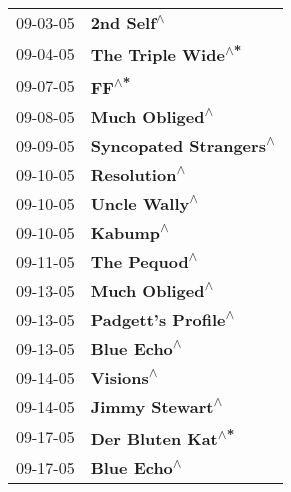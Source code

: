 \begin{supertabular}{p{0.25\columnwidth}p{0.75\columnwidth}}
 09-03-05 &                                                                 \textbf{2nd Self\textsuperscript{$\wedge$}} \\
 09-04-05 &                                                         \textbf{The Triple Wide\textsuperscript{$\wedge$*}} \\
 09-07-05 &                                                                      \textbf{FF\textsuperscript{$\wedge$*}} \\
 09-08-05 &                                                             \textbf{Much Obliged\textsuperscript{$\wedge$}} \\
 09-09-05 &                                                     \textbf{Syncopated Strangers\textsuperscript{$\wedge$}} \\
 09-10-05 &                                                               \textbf{Resolution\textsuperscript{$\wedge$}} \\
 09-10-05 &                                                              \textbf{Uncle Wally\textsuperscript{$\wedge$}} \\
 09-10-05 &                                                                   \textbf{Kabump\textsuperscript{$\wedge$}} \\
 09-11-05 &                                                               \textbf{The Pequod\textsuperscript{$\wedge$}} \\
 09-13-05 &                                                             \textbf{Much Obliged\textsuperscript{$\wedge$}} \\
 09-13-05 &                                                        \textbf{Padgett's Profile\textsuperscript{$\wedge$}} \\
 09-13-05 &                                                                \textbf{Blue Echo\textsuperscript{$\wedge$}} \\
 09-14-05 &                                                                  \textbf{Visions\textsuperscript{$\wedge$}} \\
 09-14-05 &                                                            \textbf{Jimmy Stewart\textsuperscript{$\wedge$}} \\
 09-17-05 &                                                          \textbf{Der Bluten Kat\textsuperscript{$\wedge$*}} \\
 09-17-05 &                                                                \textbf{Blue Echo\textsuperscript{$\wedge$}} \\

\end{supertabular}
